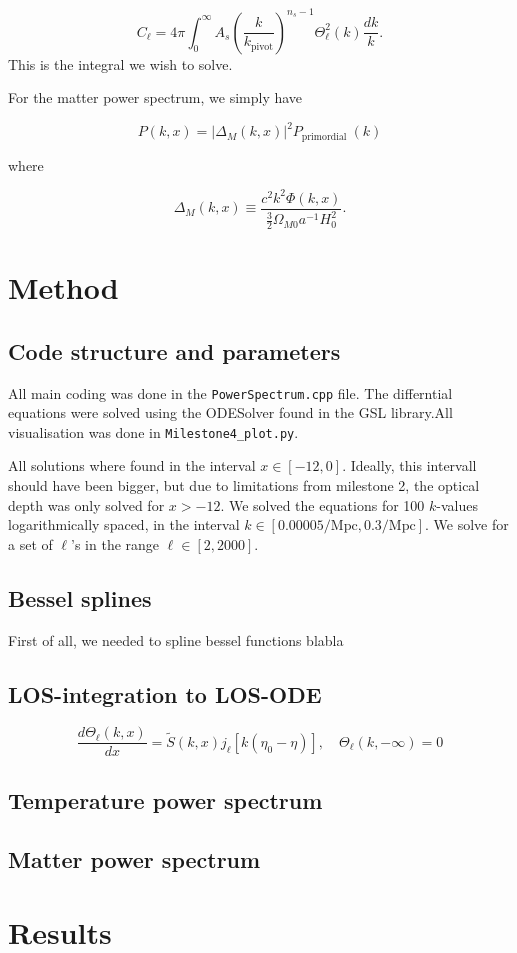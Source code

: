\documentclass[12pt]{article}
\begin{document}
\begin{equation}\label{eq temp power spectrum}
C_{\ell}=4 \pi \int_{0}^{\infty} A_{s}\left(\frac{k}{k_{\mathrm{pivot}}}\right)^{n_{s}-1} \Theta_{\ell}^{2}(k) \frac{d k}{k}.
\end{equation}
This is the integral we wish to solve. 

For the matter power spectrum, we simply have 

\begin{equation}
P(k, x)=\left|\Delta_{M}(k, x)\right|^{2} P_{\text {primordial }}(k)
\end{equation}

where 

\begin{equation}
\Delta_{M}(k, x) \equiv \frac{c^{2} k^{2} \Phi(k, x)}{\frac{3}{2} \Omega_{M 0} a^{-1} H_{0}^{2}}.
\end{equation}


\section{Method}
\subsection{Code structure and parameters}
All main coding was done in the \texttt{PowerSpectrum.cpp} file. The differntial equations were solved using the ODESolver found in the GSL library.All visualisation was done in \texttt{Milestone4\_plot.py}. 

All solutions where found in the interval $x\in[-12,0]$. Ideally, this intervall should have been bigger, but due to limitations from milestone 2, the optical depth was only solved for $x>-12$. We solved the equations for 100 $k$-values logarithmically spaced, in the interval $k\in[0.00005/\mathrm{Mpc}, 0.3/\mathrm{Mpc}]$. We solve for a set of $\ell$'s in the range $\ell \in [2, 2000]$. 

\subsection{Bessel splines}
First of all, we needed to spline bessel functions blabla

\subsection{LOS-integration to LOS-ODE}
\begin{equation}
\frac{d \Theta_{\ell}(k, x)}{d x}=\tilde{S}(k, x) j_{\ell}\left[k\left(\eta_{0}-\eta\right)\right], \quad \Theta_{\ell}(k,-\infty)=0
\end{equation}

\subsection{Temperature power spectrum}

\subsection{Matter power spectrum}
\section{Results}

{}

\end{document}
